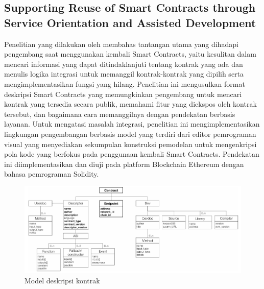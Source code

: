\subsection{Supporting Reuse of Smart Contracts through Service Orientation and Assisted Development} 
\label{subsec:supporting-reuse-smart-contracts}

Penelitian yang dilakukan oleh \cite{guida2019supporting} membahas tantangan utama yang dihadapi pengembang saat menggunakan kembali Smart Contracts, yaitu kesulitan dalam mencari informasi yang dapat ditindaklanjuti tentang kontrak yang ada dan menulis logika integrasi untuk memanggil kontrak-kontrak yang dipilih serta mengimplementasikan fungsi yang hilang. Penelitian ini mengusulkan format deskripsi Smart Contracts yang memungkinkan pengembang untuk mencari kontrak yang tersedia secara publik, memahami fitur yang diekspos oleh kontrak tersebut, dan bagaimana cara memanggilnya dengan pendekatan berbasis layanan. Untuk mengatasi masalah integrasi, penelitian ini mengimplementasikan lingkungan pengembangan berbasis model yang terdiri dari editor pemrograman visual yang menyediakan sekumpulan konstruksi pemodelan untuk mengenkripsi pola kode yang berfokus pada penggunaan kembali Smart Contracts. Pendekatan ini diimplementasikan dan diuji pada platform Blockchain Ethereum dengan bahasa pemrograman Solidity.

\begin{figure}[ht]
  \centering
  \includegraphics[width=1\textwidth]{resources/chapter-2/sc-model.png}
  \caption{Model deskripsi kontrak \parencite{guida2019supporting}}
  \label{image:sc-model}
\end{figure}

